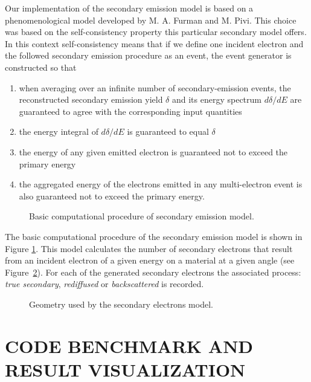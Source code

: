 \documentclass{JAC2003}
\begin{document}
Our implementation of the secondary emission model is based on a
phenomenological model developed by M. A. Furman and M. Pivi\cite{SE}. This
choice was based on the self-consistency property this particular secondary
model offers. In this context self-consistency means that if we define one incident
electron and the followed secondary emission procedure as an event, the event
generator is constructed so that
%
\begin{enumerate}
    \item when averaging over an infinite number of secondary-emission events, 
    the reconstructed secondary emission yield $\delta$ and its energy spectrum
    $ d\delta/dE$ are guaranteed to agree with the corresponding input quantities 
    \item the energy integral of $d\delta/dE$ is guaranteed to equal $\delta$
    \item the energy of any given emitted electron is guaranteed not to exceed the 
    primary energy
    \item the aggregated energy of the electrons emitted in any multi-electron event 
    is also guaranteed not to exceed the primary energy.
\end{enumerate}


\begin{figure}
    \begin{center}
        
    \end{center}
    \caption{Basic computational procedure of secondary emission model.\label{fig:S-E}}
\end{figure}

The basic computational procedure of the secondary emission model is shown in
Figure \ref{fig:S-E}. This model calculates the number of secondary electrons
that result from an incident electron of a given energy on a material at a
given angle (see Figure~\ref{incident electrons}). For each of the generated 
secondary electrons the associated process: {\em true secondary}, {\em rediffused} or
{\em backscattered} is recorded. 

\begin{figure}[H]
    \centering
    
    \caption{Geometry used by the secondary electrons model.}
    \label{incident electrons}
\end{figure}

\section{CODE BENCHMARK AND RESULT VISUALIZATION}
\end{document}
